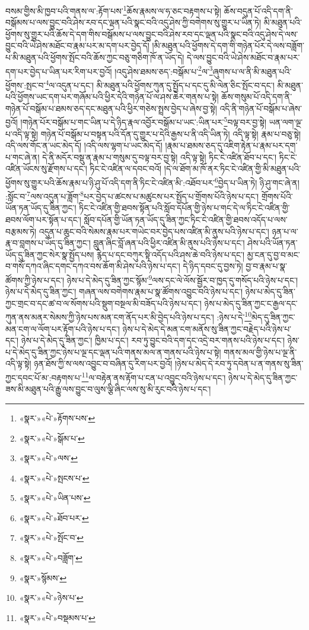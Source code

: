 བསམ་གྱིས་མི་ཁྱབ་པའི་གནས་ལ་:རྟོག་པས་\footnote{«སྣར་»«པེ་»རྟོགས་པས་}ཆོས་རྣམས་ལ་ཧ་ཅང་བརྟགས་པ་སྟེ། ཆོས་བདུན་པོ་འདི་དག་ནི་བསྒོམས་པ་ལས་བྱུང་བའི་ཤེས་རབ་དང་ལྡན་པའི་སྣང་བའི་འདུ་ཤེས་ཀྱི་བགེགས་སུ་གྱུར་པ་ཡིན་ཏེ། མི་མཐུན་པའི་ཕྱོགས་སུ་གྱུར་པའི་ཆོས་དེ་དག་གིས་བསྒོམས་པ་ལས་བྱུང་བའི་ཤེས་རབ་དང་ལྡན་པའི་སྣང་བའི་འདུ་ཤེས་དེ་ལས་བྱུང་བའི་ཡེ་ཤེས་མཐོང་བ་རྣམ་པར་མ་དག་པར་བྱེད་དོ། །མི་མཐུན་པའི་ཕྱོགས་དེ་དག་གི་གཉེན་པོར་དེ་ལས་བཟློག་པ་མི་མཐུན་པའི་ཕྱོགས་སྤོང་བའི་ཆོས་ཀྱང་བཅུ་གཅིག་ཁོ་ན་ཡོད་དེ། དེ་ལས་བྱུང་བའི་ཡེ་ཤེས་མཐོང་བ་རྣམ་པར་དག་པར་བྱེད་པ་ཡིན་པར་རིག་པར་བྱའོ། །འདུ་ཤེས་ཐམས་ཅད་:བསྒོམ་པ་\footnote{«སྣར་»«པེ་»སྒོམ་པ་}ལ་\footnote{«སྣར་»«པེ་»ལས་}ཞུགས་པ་ལ་ནི་མི་མཐུན་པའི་ཕྱོགས་:སྤང་བ་\footnote{«སྣར་»«པེ་»སྤངས་པ་}ལ་འདུན་པ་དང་། མི་མཐུན་པའི་ཕྱོགས་ཀུན་དུ་སྤྱོད་པ་དང་དུ་མི་ལེན་ཅིང་སྤོང་བ་དང་། མི་མཐུན་པའི་ཕྱོགས་ཡང་དག་པར་གཞོམ་པའི་ཕྱིར་དེའི་གཉེན་པོ་ལ་ཤས་ཆེར་གནས་པ་སྟེ། ཆོས་གསུམ་པོ་འདི་དག་ནི་གཉེན་པོ་བསྒོམ་པ་ཐམས་ཅད་དང་མཐུན་པའི་ཕྱིར་གཅེས་སྤྲས་བྱེད་པ་ཞེས་བྱ་སྟེ། འདི་ནི་གཉེན་པོ་བསྒོམ་པ་ཞེས་བྱའོ། །གཉེན་པོར་བསྒོམ་པ་གང་ཡིན་པ་དེ་ཉིད་རྣལ་འབྱོར་བསྒོམ་པ་ཡང་:ཡིན་པར་\footnote{«སྣར་»«པེ་»ཡིན་པས་}བལྟ་བར་བྱ་སྟེ། ཡན་ལག་ལྔ་པ་འདི་ལྟ་སྟེ། གཉེན་པོ་བསྒོམ་པ་བསྟན་པའི་དོན་དུ་གྱུར་པ་དེའི་རྒྱས་པ་ནི་འདི་ཡིན་ཏེ། འདི་ལྟ་སྟེ། རྣམ་པ་བཅུ་སྟེ། འདི་ལས་གོང་ན་ཡང་མེད་དོ། །འདི་ལས་ལྷག་པ་ཡང་མེད་དོ། །རྣམ་པ་ཐམས་ཅད་དུ་འཇིག་རྟེན་པ་རྣམ་པར་དག་པ་གང་ཞེ་ན། དེ་ནི་མདོར་བསྡུ་ན་རྣམ་པ་གསུམ་དུ་བལྟ་བར་བྱ་སྟེ། འདི་ལྟ་སྟེ། ཏིང་ངེ་འཛིན་ཐོབ་པ་དང་། ཏིང་ངེ་འཛིན་ཡོངས་སུ་རྫོགས་པ་དང་། ཏིང་ངེ་འཛིན་ལ་དབང་བའོ། །དེ་ལ་ཐོག་མ་ཁོ་ནར་ཏིང་ངེ་འཛིན་གྱི་མི་མཐུན་པའི་ཕྱོགས་སུ་གྱུར་པའི་ཆོས་རྣམ་པ་ཉི་ཤུ་པོ་འདི་དག་ནི་ཏིང་ངེ་འཛིན་མི་:འཐོབ་པར་\footnote{«སྣར་»«པེ་»ཐོབ་པར་}བྱེད་པ་ཡིན་ཏེ། ཉི་ཤུ་གང་ཞེ་ན། :སློང་བ་\footnote{«སྣར་»«པེ་»སྤོང་བ་}ལས་འདུན་པ་ཟློག་\footnote{«སྣར་»«པེ་»བཟློག་}པར་བྱེད་པ་ཚངས་པ་མཚུངས་པར་སྤྱོད་པ་གྲོགས་པོའི་ཉེས་པ་དང་། གྲོགས་པོའི་ཡོན་ཏན་ཡོད་དུ་ཟིན་ཀྱང་། ཏིང་ངེ་འཛིན་གྱི་ཐབས་སྟོན་པའི་སློབ་དཔོན་གྱི་ཉེས་པ་གང་དེ་ལ་ཏིང་ངེ་འཛིན་གྱི་ཐབས་ལོག་པར་སྟོན་པ་དང་། སློབ་དཔོན་གྱི་ཡོན་ཏན་ཡོད་དུ་ཟིན་ཀྱང་ཏིང་ངེ་འཛིན་གྱི་ཐབས་འདོད་པ་ལས་བརྩམས་ཏེ། འདུན་པ་ཆུང་བའི་སེམས་རྣམ་པར་གཡེང་བར་བྱེད་པས་འཛིན་མི་ནུས་པའི་ཉེས་པ་དང་། ཉན་པ་ལ་རྣ་བ་བླགས་པ་ཡོད་དུ་ཟིན་ཀྱང་། བླུན་ཞིང་བློ་ཞན་པའི་ཕྱིར་འཛིན་མི་ནུས་པའི་ཉེས་པ་དང་། ཤེས་པའི་ཡོན་ཏན་ཡོད་དུ་ཟིན་ཀྱང་སེར་སྣ་སྤྱོད་པས། རྙེད་པ་དང་བཀུར་སྟི་འདོད་པའི་ཤས་ཆེ་བའི་ཉེས་པ་དང་། མྱ་ངན་དུ་བྱ་བ་མང་བ་གསོ་དཀའ་ཞིང་དགང་དཀའ་བས་ཆོག་མི་ཤེས་པའི་ཉེས་པ་དང་། དེ་ཉིད་དབང་དུ་བྱས་ཏེ། བྱ་བ་རྣམ་པ་སྣ་ཚོགས་ཀྱི་ཉེས་པ་དང་། ཉེས་པ་དེ་མེད་དུ་ཟིན་ཀྱང་སྙོམ་\footnote{«སྣར་»སྙོམས་}ལས་དང་ལེ་ལོས་སྦྱོར་བ་ཁྱད་དུ་གསོད་པའི་ཉེས་པ་དང་། ཉེས་པ་དེ་མེད་དུ་ཟིན་ཀྱང་། གཞན་ལས་བགེགས་རྣམ་པ་སྣ་ཚོགས་འབྱུང་བའི་ཉེས་པ་དང་། ཉེས་པ་མེད་དུ་ཟིན་ཀྱང་གྲང་བ་དང་ཚ་བ་ལ་སོགས་པའི་སྡུག་བསྔལ་མི་བཟོད་པའི་ཉེས་པ་དང་། ཉེས་པ་མེད་དུ་ཟིན་ཀྱང་ང་རྒྱལ་དང་ཀུན་ནས་མནར་སེམས་ཀྱི་ཉེས་པས་མན་ངག་ནོད་པར་མི་བྱེད་པའི་ཉེས་པ་དང་། :ཉེས་པ་དེ་\footnote{«སྣར་»«པེ་»ཉེས་པ་}མེད་དུ་ཟིན་ཀྱང་མན་ངག་ལ་ལོག་པར་རྟོག་པའི་ཉེས་པ་དང་། ཉེས་པ་དེ་མེད་དེ་མན་ངག་མནོས་སུ་ཟིན་ཀྱང་བརྗེད་པའི་ཉེས་པ་དང་། ཉེས་པ་དེ་མེད་དུ་ཟིན་ཀྱང་། ཁྱིམ་པ་དང་། རབ་ཏུ་བྱུང་བའི་དག་དང་འདྲེ་བར་གནས་པའི་ཉེས་པ་དང་། ཉེས་པ་དེ་མེད་དུ་ཟིན་ཀྱང་ཉེས་པ་ལྔ་དང་ལྡན་པའི་གནས་མལ་ན་གནས་པའི་ཉེས་པ་སྟེ། གནས་མལ་གྱི་ཉེས་པ་ལྔ་ནི་འདི་ལྟ་སྟེ། ཉན་ཐོས་ཀྱི་ས་ལས་འབྱུང་བ་བཞིན་དུ་རིག་པར་བྱའོ། །ཉེས་པ་མེད་དེ་རབ་ཏུ་དབེན་པ་ན་གནས་སུ་ཟིན་ཀྱང་དབང་པོ་མ་:བརྟགས་པ་\footnote{«སྣར་»«པེ་»བསྡམས་པ་}ལ་བརྟེན་ནས་རྟོག་པ་ངན་པ་འབྱུང་བའི་ཉེས་པ་དང་། ཉེས་པ་དེ་མེད་དུ་ཟིན་ཀྱང་ཟས་མི་མཐུན་པའི་རྒྱུ་ལས་བྱུང་བ་ལུས་ལྕི་ཞིང་ལས་སུ་མི་རུང་བའི་ཉེས་པ་དང་། 